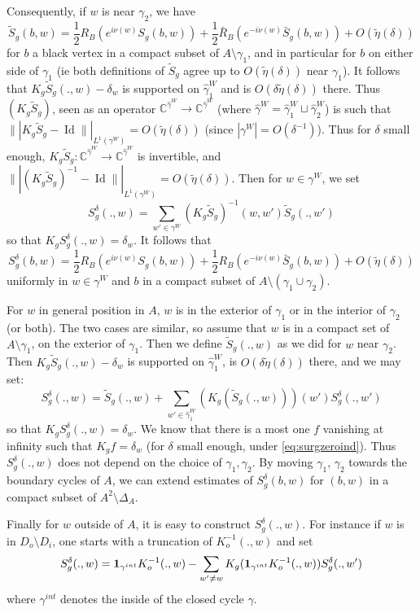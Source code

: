 \documentclass[10pt]{article}
\newcommand{\C}{\mathbb{C}}
\newcommand{\ind}{{\bf 1}}
\DeclareMathOperator{\Id}{Id}
\begin{document}
Consequently, if $w$ is near $\gamma_2$, we have
$$\tilde S_g(b,w)=\frac 12 R_B\left(e^{i\nu(w)}S_g(b,w)\right)+\frac 12 \bar R_B\left(e^{-i\nu(w)}\bar S_g(b,w)\right)+O(\tilde\eta(\delta))
$$
for $b$ a black vertex in a compact subset of $A\setminus \gamma_1$, and in particular for $b$ on either side of $\gamma_1$ (ie both definitions of $\tilde S_g$ agree up to $O(\tilde\eta(\delta))$ near $\gamma_1$). It follows that $K_g\tilde S_g(.,w)-\delta_w$ is supported on $\hat\gamma_1^W$ and is $O(\delta\tilde\eta(\delta))$ there. Thus
$(K_g\tilde S_g)$, seen as an operator $\C^{\hat\gamma^W}\rightarrow\C^{\hat\gamma^W}$ (where $\hat\gamma^W=\hat\gamma^W_1\sqcup\hat\gamma^W_2$) is such that $\||K_g\tilde S_g-\Id\||_{L^1(\gamma^W)}=O(\tilde\eta(\delta))$ (since $|\gamma^W|=O(\delta^{-1})$). Thus for $\delta$ small enough, $K_g\tilde S_g:\C^{\hat\gamma^W}\rightarrow\C^{\hat\gamma^W}$ is invertible, and $\||(K_g\tilde S_g)^{-1}-\Id\||_{L^1(\gamma^W)}=O(\tilde\eta(\delta))$. Then for $w\in\gamma^W$, we set
$$S^\delta_g(.,w)=\sum_{w'\in\gamma^W}(K_g\tilde S_g)^{-1}(w,w')\tilde S_g(.,w')$$
so that $K_gS^\delta_g(.,w)=\delta_w$. It follows that
$$S^\delta_g(b,w)=\frac 12 R_B\left(e^{i\nu(w)}S_g(b,w)\right)+\frac 12 R_B\left(e^{-i\nu(w)}\bar S_g(b,w)\right)+O(\tilde\eta(\delta))
$$
uniformly in $w\in\gamma^W$ and $b$ in a compact subset of $A\setminus(\gamma_1\cup\gamma_2)$. 

For $w$ in general position in $A$, $w$ is in the exterior of $\gamma_1$ or in the interior of $\gamma_2$ (or both). The two cases are similar, so assume that $w$ is in a compact set of $A\setminus\gamma_1$, on the exterior of $\gamma_1$. Then we define $\tilde S_g(.,w)$ as we did for $w$ near $\gamma_2$. Then $K_g\tilde S_g(.,w)-\delta_w$ is supported on $\hat\gamma^W_1$, is $O(\delta\tilde\eta(\delta))$ there, and we may set:
$$S_g^\delta(.,w)=\tilde S_g(.,w)+\sum_{w'\in\hat\gamma^W_1}(K_g(\tilde S_g(.,w)))(w')S^\delta_g(.,w')$$
so that $K_g S_g^\delta(.,w)=\delta_w$. We know that there is a most one $f$ vanishing at infinity such that $K_gf=\delta_w$ (for $\delta$ small enough, under \eqref{eq:surgzeroind}). Thus $S^\delta_g(.,w)$ does not depend on the choice of $\gamma_1,\gamma_2$. By moving $\gamma_1$, $\gamma_2$ towards the boundary cycles of $A$, we can extend estimates of $S^\delta_g(b,w)$ for $(b,w)$ in a compact subset of $A^2\setminus\Delta_A$. 

Finally for $w$ outside of $A$, it is easy to construct $S_g^\delta(.,w)$. For instance if $w$ is in $D_o\setminus D_i$, one starts with a truncation of $K_o^{-1}(.,w)$ and set
$$S_g^\delta(.,w)=\ind_{\gamma^{int}}K_o^{-1}(.,w)-\sum_{w'\neq w}K_g(\ind_{\gamma^{int}}K_o^{-1}(.,w))S^\delta_g(.,w')$$
where $\gamma^{int}$ denotes the inside of the closed cycle $\gamma$. 
\end{document}
